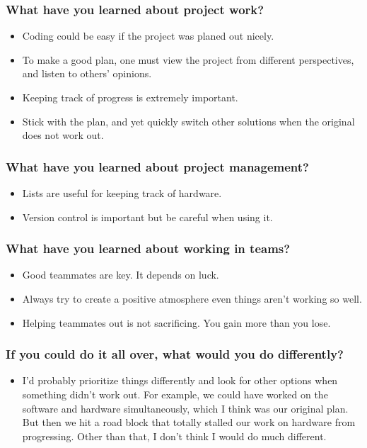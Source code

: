 \documentclass[compsoc,draftclsnofoot,onecolumn,10pt]{IEEEtran}
\begin{document}
\subsubsection*{What have you learned about project work?}
\begin{itemize}
    \item Coding could be easy if the project was planed out nicely.
    \item To make a good plan, one must view the project from different
    perspectives, and listen to others' opinions.
    \item Keeping track of progress is extremely important.
    \item Stick with the plan, and yet quickly switch other solutions
    when the original does not work out.
\end{itemize}

\subsubsection*{What have you learned about project management?}
\begin{itemize}
    \item Lists are useful for keeping track of hardware.
    \item Version control is important but be careful when using it.
\end{itemize}
  
\subsubsection*{What have you learned about working in teams?}
\begin{itemize}
    \item Good teammates are key. It depends on luck.
    \item Always try to create a positive atmosphere even things aren't
    working so well.
    \item Helping teammates out is not sacrificing. You gain more than you
    lose.
\end{itemize}

\subsubsection*{If you could do it all over, what would you do differently?}
\begin{itemize}
  \item I'd probably prioritize things differently and look for other options
  when something didn't work out. For example, we could have worked on the
  software and hardware simultaneously, which I think was our original plan.
  But then we hit a road block that totally stalled our work on hardware from
  progressing. Other than that, I don't think I would do much different.
\end{itemize}
\end{document}
